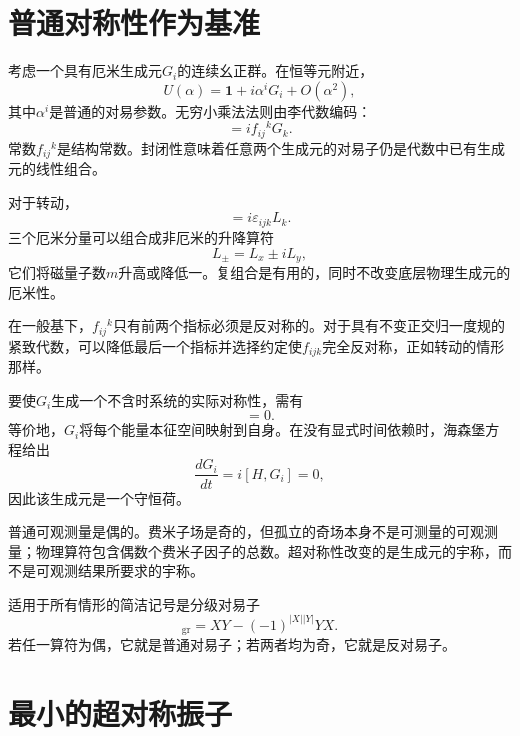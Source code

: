 \section{普通对称性作为基准}

考虑一个具有厄米生成元\(G_i\)的连续幺正群。在恒等元附近，
\begin{equation}
U(\alpha)=\mathbf 1+i\alpha^iG_i+O(\alpha^2),
\end{equation}
其中\(\alpha^i\)是普通的对易参数。无穷小乘法法则由李代数编码：
\begin{equation}
[G_i,G_j]=i f_{ij}{}^{k}G_k.
\end{equation}
常数\(f_{ij}{}^k\)是结构常数。封闭性意味着任意两个生成元的对易子仍是代数中已有生成元的线性组合。

对于转动，
\begin{equation}
[L_i,L_j]=i\varepsilon_{ijk}L_k.
\end{equation}
三个厄米分量可以组合成非厄米的升降算符
\begin{equation}
L_\pm=L_x\pm iL_y,
\end{equation}
它们将磁量子数\(m\)升高或降低一。复组合是有用的，同时不改变底层物理生成元的厄米性。

在一般基下，\(f_{ij}{}^k\)只有前两个指标必须是反对称的。对于具有不变正交归一度规的紧致代数，可以降低最后一个指标并选择约定使\(f_{ijk}\)完全反对称，正如转动的情形那样。

要使\(G_i\)生成一个不含时系统的实际对称性，需有
\begin{equation}
[H,G_i]=0.
\end{equation}
等价地，\(G_i\)将每个能量本征空间映射到自身。在没有显式时间依赖时，海森堡方程给出
\begin{equation}
\frac{dG_i}{dt}=i[H,G_i]=0,
\end{equation}
因此该生成元是一个守恒荷。

普通可观测量是偶的。费米子场是奇的，但孤立的奇场本身不是可测量的可观测量；物理算符包含偶数个费米子因子的总数。超对称性改变的是生成元的宇称，而不是可观测结果所要求的宇称。

适用于所有情形的简洁记号是分级对易子
\begin{equation}
[X,Y]_{\mathrm{gr}}
=XY-(-1)^{|X||Y|}YX.
\end{equation}
若任一算符为偶，它就是普通对易子；若两者均为奇，它就是反对易子。

\section{最小的超对称振子}


